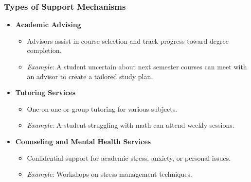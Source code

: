 \documentclass[aspectratio=169]{beamer}
\begin{document}
\begin{frame}[fragile]
    \frametitle{Types of Support Mechanisms}
    \begin{itemize}
        \item \textbf{Academic Advising}
            \begin{itemize}
                \item Advisors assist in course selection and track progress toward degree completion.
                \item \textit{Example}: A student uncertain about next semester courses can meet with an advisor to create a tailored study plan.
            \end{itemize}
        
        \item \textbf{Tutoring Services}
            \begin{itemize}
                \item One-on-one or group tutoring for various subjects.
                \item \textit{Example}: A student struggling with math can attend weekly sessions.
            \end{itemize}
        
        \item \textbf{Counseling and Mental Health Services}
            \begin{itemize}
                \item Confidential support for academic stress, anxiety, or personal issues.
                \item \textit{Example}: Workshops on stress management techniques.
            \end{itemize}
    \end{itemize}
\end{frame}
\end{document}
